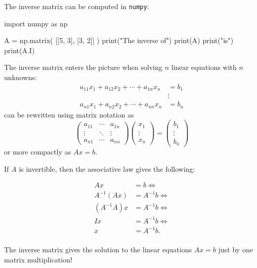 \documentclass{article}
\begin{document}
The inverse matrix can be computed in \texttt{numpy}:

\begin{sage}
import numpy as np

A = np.matrix( [[5, 3], [3, 2]] )
print("The inverse of")
print(A)
print("is")
print(A.I)

\end{sage}

The inverse matrix enters the picture when solving $n$ linear
equations with $n$ unknowns:
\begin{align*}
a_{11}x_1 + a_{12} x_2 + \cdots + a_{1n} x_n &= b_1\\
&\vdots\\
a_{n1} x_1 + a_{n2} x_2 + \cdots + a_{nn} x_n &= b_n
\end{align*}
can be rewritten using matrix notation as 
$$
\begin{pmatrix}
a_{11} &  \cdots & a_{1 n} \\
\vdots & \ddots & \vdots\\
a_{n1} & \cdots & a_{n n}
\end{pmatrix}
\begin{pmatrix}
x_1 \\ \vdots \\ x_n
\end{pmatrix}
= 
\begin{pmatrix}
b_1 \\ \vdots \\ b_n
\end{pmatrix}
$$
or more compactly as $A x = b$.



If $A$ is invertible, then the associative law gives the following:
\label{ainvsol}
\begin{frameit}
\begin{align*}
A x &= b \iff\\
 A^{-1}  \left(A x\right) &= A^{-1} b \iff \\
(A^{-1} A) x &= A^{-1} b \iff\\
I x &= A^{-1} b\iff\\
x &= A^{-1} b.\\ 
\end{align*}
\end{frameit}

The inverse matrix gives the solution to the linear equations $A x = b$ just by one matrix multiplication!
\end{document}
